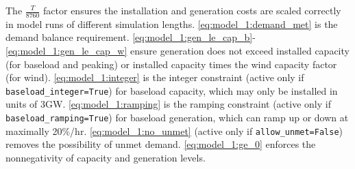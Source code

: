 \documentclass[preprint]{elsarticle}
\begin{document}
\noindent The $\frac{T}{8760}$ factor ensures the installation and generation costs are scaled correctly in model runs of different simulation lengths. \eqref{eq:model_1:demand_met} is the demand balance requirement. \eqref{eq:model_1:gen_le_cap_b}-\eqref{eq:model_1:gen_le_cap_w} ensure generation does not exceed installed capacity (for baseload and peaking) or installed capacity times the wind capacity factor (for wind). \eqref{eq:model_1:integer} is the integer constraint (active only if \texttt{baseload\_integer=True}) for baseload capacity, which may only be installed in units of 3GW. \eqref{eq:model_1:ramping} is the ramping constraint (active only if \texttt{baseload\_ramping=True}) for baseload generation, which can ramp up or down at maximally 20\%/hr. \eqref{eq:model_1:no_unmet} (active only if \texttt{allow\_unmet=False}) removes the possibility of unmet demand. \eqref{eq:model_1:ge_0} enforces the nonnegativity of capacity and generation levels.
\end{document}
